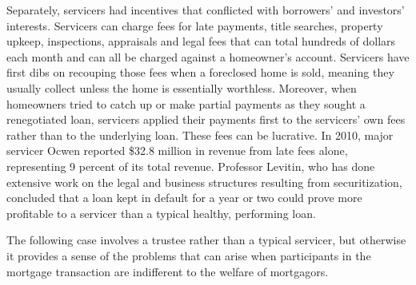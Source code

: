 Separately, servicers had incentives that conflicted with borrowers' and
investors' interests.  Servicers can charge fees for late payments, title
searches, property upkeep, inspections, appraisals and legal fees that can
total hundreds of dollars each month and can all be charged against a
homeowner's account. Servicers have first dibs on recouping those fees when a
foreclosed home is sold, meaning they usually collect unless the home is
essentially worthless. Moreover, when homeowners tried to catch up or make
partial payments as they sought a renegotiated loan, servicers applied their
payments first to the servicers' own fees rather than to the underlying loan. 
These fees can be lucrative. In 2010, major servicer Ocwen reported \$32.8
million in revenue from late fees alone, representing 9 percent of its total
revenue.  Professor Levitin, who has done extensive work on the legal and
business structures resulting from securitization, concluded that a loan kept
in default for a year or two could prove more profitable to a servicer than a
typical healthy, performing loan.

The following case involves a trustee rather than a typical servicer, but
otherwise it provides a sense of the problems that can arise when participants
in the mortgage transaction are indifferent to the welfare of mortgagors.

